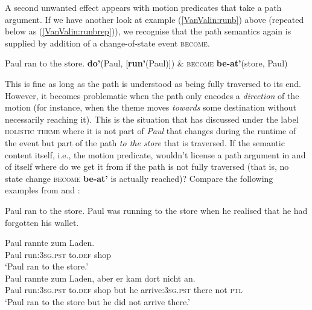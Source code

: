 A second unwanted effect appears with motion predicates that take a path argument. If we have another look at example (\ref{VanValin:runb}) above (repeated below as (\ref{VanValin:runbrep})), we recognise that the path semantics again is supplied by addition of a change-of-state event \textsc{become}. 

\ea \label{VanValin:runbrep}
\ea Paul ran to the store. 
\ex \textbf{do'}(Paul, [\textbf{run'}(Paul)]) \& \textsc{become} \textbf{be-at'}(store, Paul)
\z
\z

This is fine as long as the path is understood as being fully traversed to its end. However, it becomes problematic when the path only encodes a \emph{direction} of the motion (for instance, when the theme moves \textit{towards} some destination without necessarily reaching it). This is the situation that \citet[569]{dowty1991thematic} has discussed under the label \textsc{holistic theme} where it is not part of \textit{Paul} that changes during the runtime of the event but part of the path \textit{to the store} that is traversed. If the semantic content itself, i.e., the motion predicate, wouldn't license a path argument in and of itself where do we get it from if the path is not fully traversed (that is, no state change \textsc{become} \textbf{be-at'} is actually reached)?  Compare the following examples from  and :

\ea
\ea Paul ran to the store.\label{runstorea}
\ex Paul was running to the store when he realised that he had forgotten his wallet.\label{runstoreb}
\z
\z

\ea 
\ea \label{runstoreag}
\gll Paul rannte zum Laden.\\
Paul run:\textsc{3}\textsc{sg}.\textsc{pst} to.\textsc{def} shop \\
\glft `Paul ran to the store.'\\
\ex \label{runstorebg}
\gll Paul rannte zum Laden, aber er kam dort nicht an.\\
Paul run:\textsc{3}\textsc{sg}.\textsc{pst} to.\textsc{def} shop but he arrive:\textsc{3}\textsc{sg}.\textsc{pst} there not \textsc{ptl} \\
\glft `Paul ran to the store but he did not arrive there.'\\
\z
\z


